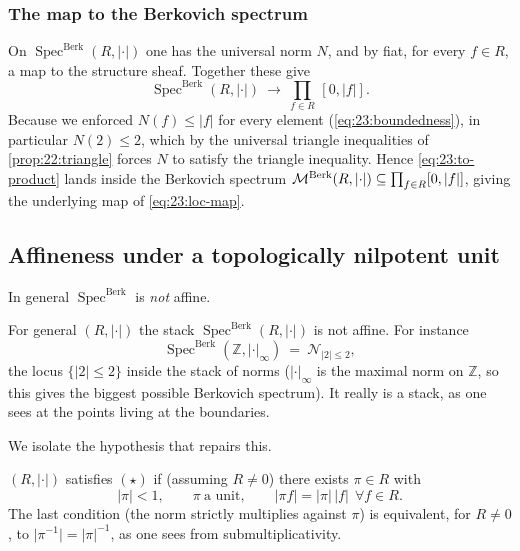 \subsubsection*{The map to the Berkovich spectrum}

On $\operatorname{Spec}^{\mathrm{Berk}}(R,\lvert\cdot\rvert)$ one has the
universal norm $N$, and by fiat, for every $f\in R$, a map to the structure
sheaf. Together these give
\begin{equation}
\label{eq:23:to-product}
\operatorname{Spec}^{\mathrm{Berk}}(R,\lvert\cdot\rvert)\ \longrightarrow\
\prod_{f\in R}\,[0,\lvert f\rvert].
\end{equation}
Because we enforced $N(f)\le\lvert f\rvert$ for every element
(\eqref{eq:23:boundedness}), in particular $N(2)\le2$, which by the universal
triangle inequalities of \cref{prop:22:triangle} forces $N$ to satisfy the
triangle inequality. Hence \eqref{eq:23:to-product} lands inside the Berkovich
spectrum $\mathcal{M}^{\mathrm{Berk}}(R,\lvert\cdot\rvert)\subseteq\prod_{f\in R}[0,\lvert f\rvert]$,
giving the underlying map of \eqref{eq:23:loc-map}.

\subsection{Affineness under a topologically nilpotent unit}
\label{subsec:23:affine}

In general $\operatorname{Spec}^{\mathrm{Berk}}$ is \emph{not} affine.

\begin{example}
\label{ex:23:integers}
For general $(R,\lvert\cdot\rvert)$ the stack
$\operatorname{Spec}^{\mathrm{Berk}}(R,\lvert\cdot\rvert)$ is not affine. For
instance
\begin{equation*}
\operatorname{Spec}^{\mathrm{Berk}}(\mathbb Z,\lvert\cdot\rvert_\infty)
\ =\ \mathcal N_{\lvert2\rvert\le2},
\end{equation*}
the locus $\{\lvert2\rvert\le2\}$ inside the stack of norms
($\lvert\cdot\rvert_\infty$ is the maximal norm on $\mathbb Z$, so this gives the
biggest possible Berkovich spectrum). It really is a stack, as one sees at the
points living at the boundaries.
\end{example}

We isolate the hypothesis that repairs this.

\begin{definition}
\label{def:23:star}
$(R,\lvert\cdot\rvert)$ satisfies $(\star)$ if (assuming $R\ne0$) there exists
$\pi\in R$ with
\begin{equation*}
\lvert\pi\rvert<1,\qquad \pi\ \text{a unit},\qquad
\lvert\pi f\rvert=\lvert\pi\rvert\,\lvert f\rvert\ \ \forall f\in R .
\end{equation*}
The last condition (the norm strictly multiplies against $\pi$) is equivalent,
for $R\ne0$, to $\lvert\pi^{-1}\rvert=\lvert\pi\rvert^{-1}$, as one sees from
submultiplicativity.
\end{definition}


